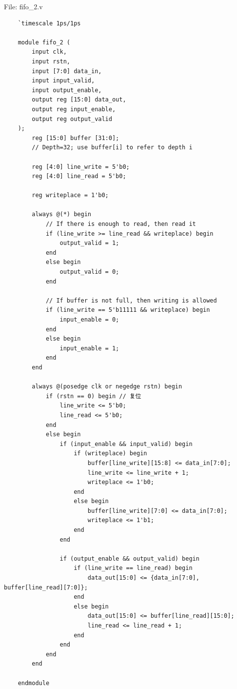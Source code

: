 \documentclass{article}
\begin{document}
File: fifo\_2.v
\begin{lstlisting}
    `timescale 1ps/1ps

    module fifo_2 (
        input clk,
        input rstn,
        input [7:0] data_in,
        input input_valid,
        input output_enable,
        output reg [15:0] data_out,
        output reg input_enable,
        output reg output_valid
    );
        reg [15:0] buffer [31:0];
        // Depth=32; use buffer[i] to refer to depth i
    
        reg [4:0] line_write = 5'b0;
        reg [4:0] line_read = 5'b0;
    
        reg writeplace = 1'b0;
    
        always @(*) begin
            // If there is enough to read, then read it
            if (line_write >= line_read && writeplace) begin
                output_valid = 1;
            end
            else begin
                output_valid = 0;
            end
    
            // If buffer is not full, then writing is allowed
            if (line_write == 5'b11111 && writeplace) begin
                input_enable = 0;
            end
            else begin
                input_enable = 1;
            end
        end
    
        always @(posedge clk or negedge rstn) begin
            if (rstn == 0) begin // 复位
                line_write <= 5'b0;
                line_read <= 5'b0;
            end
            else begin
                if (input_enable && input_valid) begin
                    if (writeplace) begin
                        buffer[line_write][15:8] <= data_in[7:0];
                        line_write <= line_write + 1;
                        writeplace <= 1'b0;
                    end
                    else begin
                        buffer[line_write][7:0] <= data_in[7:0];
                        writeplace <= 1'b1;
                    end
                end
    
                if (output_enable && output_valid) begin
                    if (line_write == line_read) begin
                        data_out[15:0] <= {data_in[7:0], buffer[line_read][7:0]};
                    end
                    else begin
                        data_out[15:0] <= buffer[line_read][15:0];
                        line_read <= line_read + 1;
                    end
                end
            end
        end
        
    endmodule
\end{lstlisting}
\end{document}
